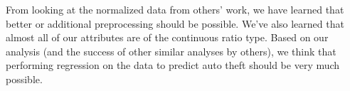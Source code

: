 From looking at the normalized data from others' work, we have learned that better or additional preprocessing should be possible. We've also learned that almost all of our attributes are of the continuous ratio type. Based on our analysis (and the success of other similar analyses by others), we think that performing regression on the data to predict auto theft should be very much possible.
